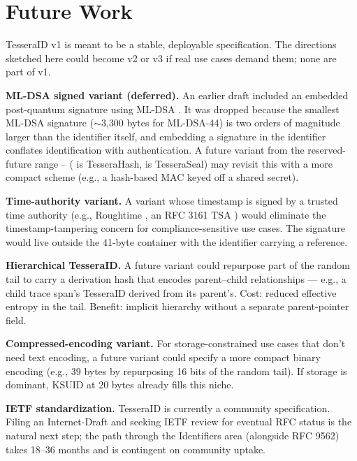 \section{Future Work}
\label{sec:future}

TesseraID v1 is meant to be a stable, deployable specification. The directions sketched here could become v2 or v3 if real use cases demand them; none are part of v1.

\textbf{ML-DSA signed variant (deferred).} An earlier draft included an embedded post-quantum signature using ML-DSA \citep{fips204}. It was dropped because the smallest ML-DSA signature ($\sim$3{,}300 bytes for ML-DSA-44) is two orders of magnitude larger than the identifier itself, and embedding a signature in the identifier conflates identification with authentication. A future variant from the reserved-future range -- ( is TesseraHash,  is TesseraSeal) may revisit this with a more compact scheme (e.g., a hash-based MAC keyed off a shared secret).

\textbf{Time-authority variant.} A variant whose timestamp is signed by a trusted time authority (e.g., Roughtime \citep{roughtime}, an RFC 3161 TSA \citep{rfc3161}) would eliminate the timestamp-tampering concern for compliance-sensitive use cases. The signature would live outside the 41-byte container with the identifier carrying a reference.

\textbf{Hierarchical TesseraID.} A future variant could repurpose part of the random tail to carry a derivation hash that encodes parent--child relationships --- e.g., a child trace span's TesseraID derived from its parent's. Cost: reduced effective entropy in the tail. Benefit: implicit hierarchy without a separate parent-pointer field.

\textbf{Compressed-encoding variant.} For storage-constrained use cases that don't need text encoding, a future variant could specify a more compact binary encoding (e.g., 39 bytes by repurposing 16 bits of the random tail). If storage is dominant, KSUID at 20 bytes already fills this niche.

\textbf{IETF standardization.} TesseraID is currently a community specification. Filing an Internet-Draft and seeking IETF review for eventual RFC status is the natural next step; the path through the Identifiers area (alongside RFC 9562) takes 18--36 months and is contingent on community uptake.

